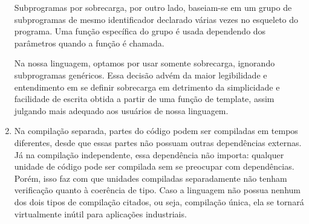 \documentclass[12pt, a4paper]{article}
\begin{document}
\begin{enumerate}
        Subprogramas por sobrecarga, por outro lado, baseiam-se em um grupo de
        subprogramas de mesmo identificador declarado várias vezes no esqueleto
        do programa. Uma função específica do grupo é usada dependendo dos
        parâmetros quando a função é chamada.

        Na nossa linguagem, optamos por usar somente sobrecarga, ignorando
        subprogramas genéricos. Essa decisão advém da maior legibilidade e
        entendimento em se definir sobrecarga em detrimento da simplicidade e
        facilidade de escrita obtida a partir de uma função de template, assim
        julgando mais adequado aos usuários de nossa linguagem.

        \begin{comment}
            Com sobrecarga:
            int soma(int a, int b) {
                return a+b;
            }

            float soma(float a, float b) {
                return a+b;
            }

            int soma(String a, String b) {
                return a^b;
            }
        \end{comment}

        \item
        \begin{comment}
            (Compilação separada: as unidades de compilação podem ser
            compiladas em tempos diferentes, mas elas não são independentes uma
            da outra se qualquer uma delas acessar ou usar quaisquer entidades
            da outra. Tal interdependência é necessária se precisar ser feita
            verificação de interface.) (Compilação independente: unidades de
            programa podem ser compiladas sem informações sobre quaisquer
            outras unidades de programa.  Unidades compiladas separadamente não
            são verificadas quanto à coerência de tipos) (Algumas linguagens
            não oferecem nem compilação separada, nem compilação independente,
            significando que somente a unidade de compilação é um programa
            completo. Isso a torna virtualmente inútil para aplicações
            industriais)
        \end{comment}

        Na compilação separada, partes do código podem ser compiladas em tempos
        diferentes, desde que essas partes não possuam outras dependências
        externas. Já na compilação independente, essa dependência não importa:
        qualquer unidade de código pode ser compilada sem se preocupar com
        dependências. Porém, isso faz com que unidades compiladas separadamente
        não tenham verificação quanto à coerência de tipo. Caso a linguagem não
        possua nenhum dos dois tipos de compilação citados, ou seja, compilação
        única, ela se tornará virtualmente inútil para aplicações industriais.


\end{enumerate}
\end{document}

